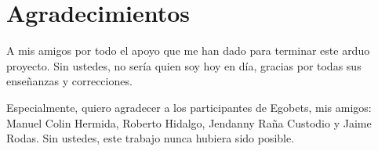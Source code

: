 \chapter*{Agradecimientos}

A mis amigos por todo el apoyo que me han dado para terminar este arduo proyecto. Sin ustedes, no sería quien soy hoy en día, gracias por todas sus enseñanzas y correcciones.

Especialmente, quiero agradecer a los participantes de Egobets, mis amigos: Manuel Colin Hermida, Roberto Hidalgo, Jendanny Raña Custodio y Jaime Rodas. Sin ustedes, este trabajo nunca hubiera sido posible.


 \newpage
 \tableofcontents
 
\cleardoublepage
{} %
\listoffigures

